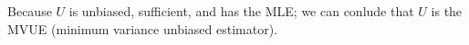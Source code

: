 Because $U$ is unbiased, sufficient, and has the MLE; we can conlude that $U$ is the MVUE (minimum variance unbiased estimator).